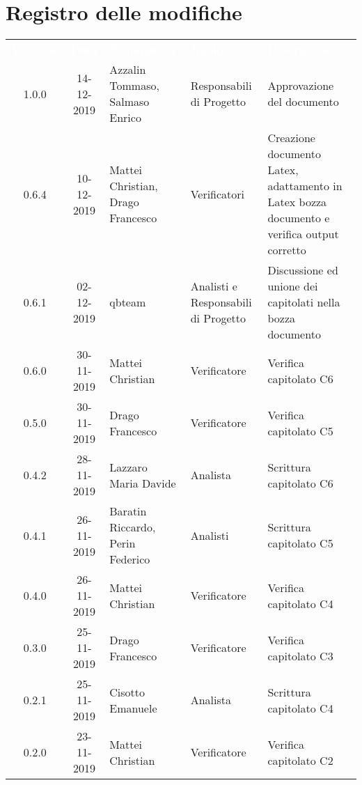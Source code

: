 \section*{Registro delle modifiche}
{
\renewcommand{\arraystretch}{1.5}
\centering
\begin{longtable}{ c c  C{4cm}  C{3cm} C{4cm}}
\textcolor{white}{\textbf{Versione}} & \textcolor{white}{\textbf{Data}} & \textcolor{white}{\textbf{Nominativo}} & \textcolor{white}{\textbf{Ruolo}} & \textcolor{white}{\textbf{Descrizione}}\\	

1.0.0 & 14-12-2019 & Azzalin Tommaso, Salmaso Enrico & Responsabili di Progetto & Approvazione del documento \\	
		
0.6.4 & 10-12-2019 & Mattei Christian, Drago Francesco & Verificatori & Creazione documento Latex, adattamento in Latex bozza documento e verifica output corretto\\

0.6.1 & 02-12-2019 & qbteam & Analisti e Responsabili di Progetto & Discussione ed unione dei capitolati nella bozza documento \\

0.6.0 & 30-11-2019 & Mattei Christian & Verificatore & Verifica capitolato C6 \\

0.5.0 & 30-11-2019 & Drago Francesco & Verificatore & Verifica capitolato C5 \\

0.4.2 & 28-11-2019 & Lazzaro Maria Davide & Analista & Scrittura capitolato C6 \\

0.4.1 & 26-11-2019 & Baratin Riccardo, Perin Federico & Analisti & Scrittura capitolato C5 \\

0.4.0 & 26-11-2019 & Mattei Christian & Verificatore & Verifica capitolato C4 \\

0.3.0 & 25-11-2019 & Drago Francesco & Verificatore & Verifica capitolato C3 \\

0.2.1 & 25-11-2019 & Cisotto Emanuele & Analista & Scrittura capitolato C4 \\

0.2.0 & 23-11-2019 & Mattei Christian & Verificatore & Verifica capitolato C2 \\


\end{longtable}}
